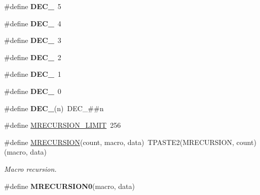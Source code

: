 \begin{DoxyCompactItemize}
\item 
\hypertarget{group__group__sam0__utils__mrecursion_gabc70c4033590756b305a2b701cafdbf4}{}\#define {\bfseries D\+E\+C\+\_}~5\label{group__group__sam0__utils__mrecursion_gabc70c4033590756b305a2b701cafdbf4}

\item 
\hypertarget{group__group__sam0__utils__mrecursion_ga64e9807a7659cc7abe63d36d17d70d39}{}\#define {\bfseries D\+E\+C\+\_}~4\label{group__group__sam0__utils__mrecursion_ga64e9807a7659cc7abe63d36d17d70d39}

\item 
\hypertarget{group__group__sam0__utils__mrecursion_gad7e2e1a9550d96b04bdc72f130d39b47}{}\#define {\bfseries D\+E\+C\+\_}~3\label{group__group__sam0__utils__mrecursion_gad7e2e1a9550d96b04bdc72f130d39b47}

\item 
\hypertarget{group__group__sam0__utils__mrecursion_ga5fb5d565ab4804779b887b1ae50fe793}{}\#define {\bfseries D\+E\+C\+\_}~2\label{group__group__sam0__utils__mrecursion_ga5fb5d565ab4804779b887b1ae50fe793}

\item 
\hypertarget{group__group__sam0__utils__mrecursion_gaf4b9ebe713bf0f2f3028babcd538e83e}{}\#define {\bfseries D\+E\+C\+\_}~1\label{group__group__sam0__utils__mrecursion_gaf4b9ebe713bf0f2f3028babcd538e83e}

\item 
\hypertarget{group__group__sam0__utils__mrecursion_gadd8cf94f6ebfd2e525f0a920d25bc164}{}\#define {\bfseries D\+E\+C\+\_}~0\label{group__group__sam0__utils__mrecursion_gadd8cf94f6ebfd2e525f0a920d25bc164}

\item 
\hypertarget{group__group__sam0__utils__mrecursion_ga1d23d683797679dca8c3512a54a5dcae}{}\#define {\bfseries D\+E\+C\+\_\+}(n)~D\+E\+C\+\_\+\#\#n\label{group__group__sam0__utils__mrecursion_ga1d23d683797679dca8c3512a54a5dcae}

\item 
\#define \hyperlink{group__group__sam0__utils__mrecursion_ga8738104d47c117b0a7172dbe799ca9ff}{M\+R\+E\+C\+U\+R\+S\+I\+O\+N\+\_\+\+L\+I\+M\+I\+T}~256
\item 
\#define \hyperlink{group__group__sam0__utils__mrecursion_ga8856265949fb54fdffc8b9ea53a647e8}{M\+R\+E\+C\+U\+R\+S\+I\+O\+N}(count,  macro,  data)~T\+P\+A\+S\+T\+E2(M\+R\+E\+C\+U\+R\+S\+I\+O\+N, count) (macro, data)
\begin{DoxyCompactList}\small\item\em Macro recursion. \end{DoxyCompactList}\item 
\hypertarget{group__group__sam0__utils__mrecursion_gab63319edc51e16704df52c6ca97886f0}{}\#define {\bfseries M\+R\+E\+C\+U\+R\+S\+I\+O\+N0}(macro,  data)\label{group__group__sam0__utils__mrecursion_gab63319edc51e16704df52c6ca97886f0}


\end{DoxyCompactItemize}
